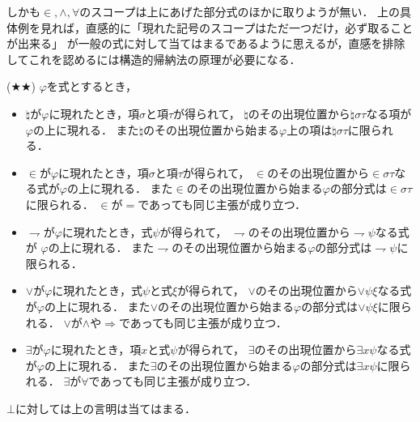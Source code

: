	しかも$\in,\wedge,\forall$のスコープは上にあげた部分式のほかに取りようが無い．
	上の具体例を見れば，直感的に「現れた記号のスコープはただ一つだけ，必ず取ることが出来る」
	が一般の式に対して当てはまるであるように思えるが，直感を排除してこれを認めるには構造的帰納法の原理が必要になる．
	
	\begin{screen}
		\begin{metathm}
		(★★) $\varphi$を式とするとき，
		\begin{itemize}
			\item $\natural$が$\varphi$に現れたとき，項$\sigma$と項$\tau$が得られて，
				$\natural$のその出現位置から$\natural \sigma \tau$なる項が$\varphi$の上に現れる．
				また$\natural$のその出現位置から始まる$\varphi$上の項は$\natural \sigma \tau$に限られる．
				
			\item $\in$が$\varphi$に現れたとき，項$\sigma$と項$\tau$が得られて，
				$\in$のその出現位置から$\in \sigma \tau$なる式が$\varphi$の上に現れる．
				また$\in$のその出現位置から始まる$\varphi$の部分式は$\in \sigma \tau$に限られる．
				$\in$が$=$であっても同じ主張が成り立つ．
				
			\item $\rightharpoondown$が$\varphi$に現れたとき，式$\psi$が得られて，
				$\rightharpoondown$のその出現位置から$\rightharpoondown \psi$なる式が
				$\varphi$の上に現れる．
				また$\rightharpoondown$のその出現位置から始まる$\varphi$の部分式は$\rightharpoondown \psi$に限られる．
				
			\item $\vee$が$\varphi$に現れたとき，式$\psi$と式$\xi$が得られて，
				$\vee$のその出現位置から$\vee \psi \xi$なる式が$\varphi$の上に現れる．
				また$\vee$のその出現位置から始まる$\varphi$の部分式は$\vee \psi \xi$に限られる．
				$\vee$が$\wedge$や$\Longrightarrow$であっても同じ主張が成り立つ．
				
			\item $\exists$が$\varphi$に現れたとき，項$x$と式$\psi$が得られて，
				$\exists$のその出現位置から$\exists x \psi$なる式が$\varphi$の上に現れる．
				また$\exists$のその出現位置から始まる$\varphi$の部分式は$\exists x \psi$に限られる．
				$\exists$が$\forall$であっても同じ主張が成り立つ．
		\end{itemize}
		\end{metathm}
	\end{screen}
	
	$\bot$に対しては上の言明は当てはまる．
	
